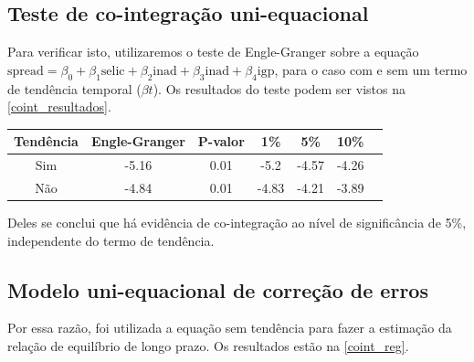 \documentclass[a4paper,
               article,
               12pt,
               openany,
               oneside,
               english,
               brazil]{abntex2}
\numberwithin{equation}{section}
\begin{document}
    \subsection{Teste de co-integração uni-equacional}

    Para verificar isto, utilizaremos o teste de Engle-Granger sobre a equação $ \text{spread} = \beta_0 + \beta_1 \text{selic} + \beta_2 \text{inad} + \beta_3 \text{inad} +\beta_4 \text{igp} $, para o caso com e sem um termo de tendência temporal ($ \beta t $). Os resultados do teste podem ser vistos na \autoref{coint_resultados}.

    \begin{table}[hbt]
        {%
            \begin{tabular}{ccccccc}
                \midrule
                Tendência & Engle-Granger & P-valor & 1\% & 5\% & 10\% \\
                \midrule
                Sim & -5.16 & 0.01 & -5.2 & -4.57 & -4.26 \\
                Não & -4.84 & 0.01 & -4.83 & -4.21 & -3.89 \\
                \midrule
            \end{tabular}
            } 
            {}
    \end{table}

    Deles se conclui que há evidência de co-integração ao nível de significância de 5\%, independente do termo de tendência.
    
    \subsection{Modelo uni-equacional de correção de erros}

    Por essa razão, foi utilizada a equação sem tendência para fazer a estimação da relação de equilíbrio de longo prazo. Os resultados estão na \autoref{coint_reg}.
\end{document}
